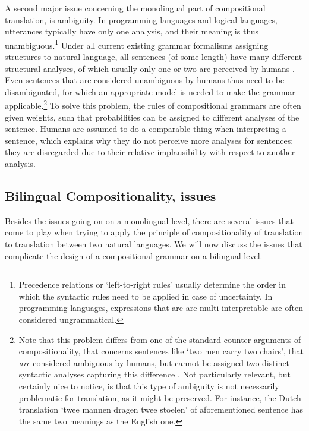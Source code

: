 \documentclass{report}
\begin{document}
A second major issue concerning the monolingual part of compositional translation, is ambiguity. In programming languages and logical languages, utterances typically have only one analysis, and their meaning is thus unambiguous.\footnote{Precedence relations or `left-to-right rules' usually determine the order in which the syntactic rules need to be applied in case of uncertainty. In programming languages, expressions that are are multi-interpretable are often considered ungrammatical.} Under all current existing grammar formalisms assigning structures to natural language, all sentences (of some length) have many different structural analyses, of which usually only one or two are perceived by humans \citep{scha1990taaltheorie}. Even sentences that are considered unambiguous by humans thus need to be disambiguated, for which an appropriate model is needed to make the grammar applicable.\footnote{Note that this problem differs from one of the standard counter arguments of compositionality, that concerns sentences like `two men carry two chairs', that \textit{are} considered ambiguous by humans, but cannot be assigned two distinct syntactic analyses capturing this difference \citep{pelletier1994principle}. Not particularly relevant, but certainly nice to notice, is that this type of ambiguity is not necessarily problematic for translation, as it might be preserved. For instance, the Dutch translation `twee mannen dragen twee stoelen' of aforementioned sentence has the same two meanings as the English one.} To solve this problem, the rules of compositional grammars are often given weights, such that probabilities can be assigned to different analyses of the sentence. Humans are assumed to do a comparable thing when interpreting a sentence, which explains why they do not perceive more analyses for sentences: they are disregarded due to their relative implausibility with respect to another analysis.

\subsection{Bilingual Compositionality, issues}
\label{subsec:bilingual_problems}

Besides the issues going on on a monolingual level, there are several issues that come to play when trying to apply the principle of compositionality of translation to translation between two natural languages. We will now discuss the issues that complicate the design of a compositional grammar on a bilingual level.
\end{document}
